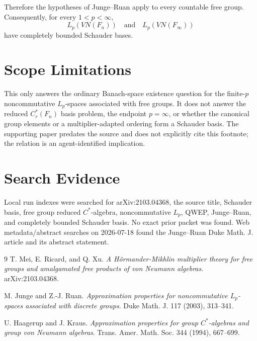 \documentclass[11pt]{article}
\begin{document}
Therefore the hypotheses of Junge--Ruan apply to every countable free group.
Consequently, for every \(1<p<\infty\),
\[
  L_p(VN(F_n)) \quad\text{and}\quad L_p(VN(F_\infty))
\]
have completely bounded Schauder bases.

\section*{Scope Limitations}

This only answers the ordinary Banach-space existence question for the
finite-\(p\) noncommutative \(L_p\)-spaces associated with free groups.  It
does not answer the reduced \(C^\ast_r(F_n)\) basis problem, the endpoint
\(p=\infty\), or whether the canonical group elements or a multiplier-adapted
ordering form a Schauder basis.  The supporting paper predates the source and
does not explicitly cite this footnote; the relation is an agent-identified
implication.

\section*{Search Evidence}

Local run indexes were searched for arXiv:2103.04368, the source title,
Schauder basis, free group reduced \(C^\ast\)-algebra, noncommutative \(L_p\),
QWEP, Junge--Ruan, and completely bounded Schauder basis.  No exact prior
packet was found.  Web metadata/abstract searches on 2026-07-18 found the
Junge--Ruan Duke Math. J. article and its abstract statement.

\begin{thebibliography}{9}
T. Mei, E. Ricard, and Q. Xu.
\emph{A H\"ormander-Mikhlin multiplier theory for free groups and amalgamated
free products of von Neumann algebras}. arXiv:2103.04368.

M. Junge and Z.-J. Ruan.
\emph{Approximation properties for noncommutative \(L_p\)-spaces associated
with discrete groups}. Duke Math. J. 117 (2003), 313--341.

U. Haagerup and J. Kraus.
\emph{Approximation properties for group \(C^\ast\)-algebras and group von
Neumann algebras}. Trans. Amer. Math. Soc. 344 (1994), 667--699.
\end{thebibliography}
\end{document}
